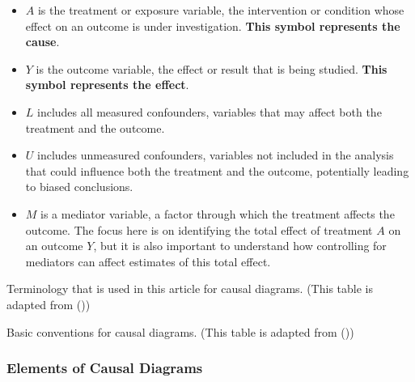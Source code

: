 \documentclass[
  singlecolumn]{article}
\providecommand{\tightlist}{%
  \setlength{\itemsep}{0pt}\setlength{\parskip}{0pt}}\usepackage{longtable,booktabs,array}
\begin{document}
\begin{itemize}
\tightlist
\item
  \textbf{\(A\)} is the treatment or exposure variable, the intervention
  or condition whose effect on an outcome is under investigation.
  \textbf{This symbol represents the cause}.
\item
  \textbf{\(Y\)} is the outcome variable, the effect or result that is
  being studied. \textbf{This symbol represents the effect}.
\item
  \textbf{\(L\)} includes all measured confounders, variables that may
  affect both the treatment and the outcome.
\item
  \textbf{\(U\)} includes unmeasured confounders, variables not included
  in the analysis that could influence both the treatment and the
  outcome, potentially leading to biased conclusions.
\item
  \textbf{\(M\)} is a mediator variable, a factor through which the
  treatment affects the outcome. The focus here is on identifying the
  total effect of treatment \(A\) on an outcome \(Y\), but it is also
  important to understand how controlling for mediators can affect
  estimates of this total effect.
\end{itemize}

\begin{table}

\caption{\label{tbl-01}Terminology that is used in this article for
causal diagrams. (This table is adapted from
())}

\centering{

\terminologylocalconventionssimple

}

\end{table}%

\begin{table}

\caption{\label{tbl-02}Basic conventions for causal diagrams. (This
table is adapted from ())}

\centering{

\terminologygeneralbasic

}

\end{table}%

\subsubsection{Elements of Causal
Diagrams}\label{elements-of-causal-diagrams}
\end{document}
